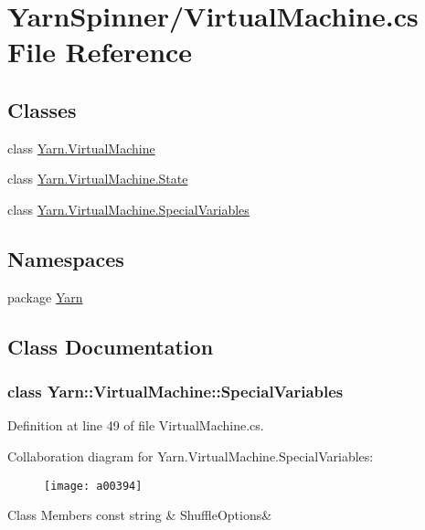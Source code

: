 \hypertarget{a00316}{\section{Yarn\-Spinner/\-Virtual\-Machine.cs File Reference}
\label{a00316}
}
\subsection*{Classes}
\begin{DoxyCompactItemize}
\item 
class \hyperlink{a00162}{Yarn.\-Virtual\-Machine}
\item 
class \hyperlink{a00165}{Yarn.\-Virtual\-Machine.\-State}
\item 
class \hyperlink{a00162_a00381}{Yarn.\-Virtual\-Machine.\-Special\-Variables}
\end{DoxyCompactItemize}
\subsection*{Namespaces}
\begin{DoxyCompactItemize}
\item 
package \hyperlink{a00051}{Yarn}
\end{DoxyCompactItemize}


\subsection{Class Documentation}
\label{a00381}
\hypertarget{a00162_a00381}{}
\subsubsection{class Yarn\-:\-:Virtual\-Machine\-:\-:Special\-Variables}


Definition at line 49 of file Virtual\-Machine.\-cs.



Collaboration diagram for Yarn.\-Virtual\-Machine.\-Special\-Variables\-:
\nopagebreak
\begin{figure}[H]
\begin{center}
\leavevmode
\texttt{[image: a00394]}
\end{center}
\end{figure}
\begin{DoxyFields}{Class Members}
\hypertarget{a00162_aecbb8ab9becd96457d836100b2818078}{const string}\label{a00162_aecbb8ab9becd96457d836100b2818078}
&
Shuffle\-Options&
\\
\hline

\end{DoxyFields}
